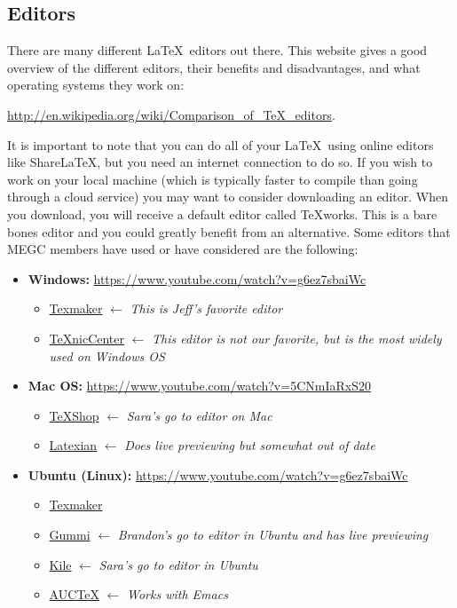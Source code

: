 \documentclass[]{article}%
\theoremstyle{definition}
\begin{document}
\subsection{Editors}
There are many different \LaTeX\ editors out there.
This website gives a good overview of the different editors, their benefits and disadvantages, and what operating systems they work on:
\begin{center}
\url{http://en.wikipedia.org/wiki/Comparison_of_TeX_editors}.
\end{center}
It is important to note that you can do all of your \LaTeX\ using online editors like ShareLaTeX, but you need an internet connection to do so.
If you wish to work on your local machine (which is typically faster to compile than going through a cloud service) you may want to consider downloading an editor.
When you download, you will receive a default editor called TeXworks.
This is a bare bones editor and you could greatly benefit from an alternative.
Some editors that MEGC members have used or have considered are the following:
\begin{itemize}
 	\item \textbf{Windows:} \url{https://www.youtube.com/watch?v=g6ez7sbaiWc}
    \begin{itemize}
    	\item \href{http://www.xm1math.net/texmaker/}{Texmaker} $\leftarrow$ \emph{This is Jeff's favorite editor}
    	\item \href{http://www.texniccenter.org/}{TeXnicCenter} $\leftarrow$ \emph{This editor is not our favorite, but is the most widely used on Windows OS}
    \end{itemize}
 \item \textbf{Mac OS:} \url{https://www.youtube.com/watch?v=5CNmIaRxS20}
    \begin{itemize}
     	\item \href{http://pages.uoregon.edu/koch/texshop/}{TeXShop} $\leftarrow$ \emph{Sara's go to editor on Mac}
     	\item \href{http://tacosw.com/latexian/download.php}{Latexian} $\leftarrow$ \emph{Does live previewing but somewhat out of date}
    \end{itemize}
 \item \textbf{Ubuntu (Linux):} \url{https://www.youtube.com/watch?v=g6ez7sbaiWc}
    \begin{itemize}
    	\item \href{https://apps.ubuntu.com/cat/applications/texmaker/}{Texmaker}
     	\item \href{https://apps.ubuntu.com/cat/applications/precise/gummi/}{Gummi} $\leftarrow$ \emph{Brandon's go to editor in Ubuntu and has live previewing}
     	\item \href{https://apps.ubuntu.com/cat/applications/kile/}{Kile} $\leftarrow$ \emph{Sara's go to editor in Ubuntu}
     	\item \href{https://www.gnu.org/software/auctex/}{AUCTeX} $\leftarrow$ \emph{Works with Emacs}
     \end{itemize}
\end{itemize}
\end{document}
